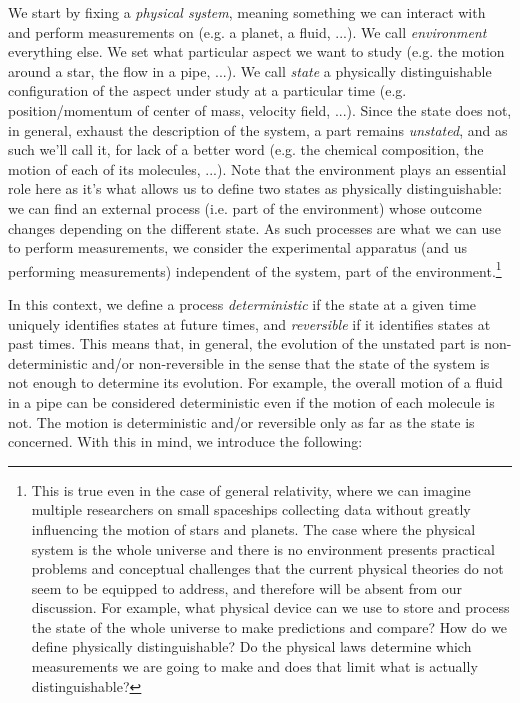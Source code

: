 \documentclass[aps,pra,10pt,twocolumn,floatfix,nofootinbib]{revtex4-1}
\theoremstyle{definition}
\begin{document}
We start by fixing a \emph{physical system}, meaning something we can interact with and perform measurements on (e.g. a planet, a fluid, ...). We call \emph{environment} everything else. We set what particular aspect we want to study (e.g. the motion around a star, the flow in a pipe, ...). We call \emph{state} a physically distinguishable configuration of the aspect under study at a particular time (e.g. position/momentum of center of mass, velocity field, ...). Since the state does not, in general, exhaust the description of the system, a part remains \emph{unstated}, and as such we'll call it, for lack of a better word (e.g. the chemical composition, the motion of each of its molecules, ...). Note that the environment plays an essential role here as it's what allows us to define two states as physically distinguishable: we can find an external process (i.e. part of the environment) whose outcome changes depending on the different state. As such processes are what we can use to perform measurements, we consider the experimental apparatus (and us performing measurements) independent of the system, part of the environment.\footnote{This is true even in the case of general relativity, where we can imagine multiple researchers on small spaceships collecting data without greatly influencing the motion of stars and planets. The case where the physical system is the whole universe and there is no environment presents practical problems  and conceptual challenges that the current physical theories do not seem to be equipped to address, and therefore will be absent from our discussion. For example, what physical device can we use to store and process the state of the whole universe to make predictions and compare? How do we define physically distinguishable? Do the physical laws determine which measurements we are going to make and does that limit what is actually distinguishable?}
 
In this context, we define a process \emph{deterministic} if the state at a given time uniquely identifies states at future times, and \emph{reversible} if it identifies states at past times. This means that, in general, the evolution of the unstated part is non-deterministic and/or non-reversible in the sense that the state of the system is not enough to determine its evolution. For example, the overall motion of a fluid in a pipe can be considered deterministic even if the motion of each molecule is not. The motion is deterministic and/or reversible only as far as the state is concerned. With this in mind, we introduce the following:
\end{document}

